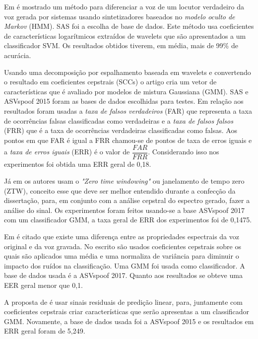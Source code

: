 \begin{myenv}{1.5}
		\par Em \cite{DiqunYan2019} é mostrado um método para diferenciar a voz de um locutor verdadeiro da voz gerada por sistemas usando sintetizadores baseados no \textit{modelo oculto de Markov} (HMM). SAS\cite{SAS2019} foi a escolha de base de dados. Este método usa coeficientes de características logarítmicos extraídos de wavelets que são apresentados a um classificador SVM. Os resultados obtidos tiverem, em média, mais de 99\% de acurácia.
		
		\par Usando uma decomposição por espalhamento baseada em wavelets e convertendo o resultado em coeficientes cepstrais (SCCs) o artigo \cite{7802552} cria um vetor de características que é avaliado por modelos de mistura Gaussiana (GMM). SAS e ASVspoof 2015 \cite{ASVspoof2015} foram as bases de dados escolhidas para testes. Em relação aos resultados foram usadas a \textit{taxa de falsos verdadeiros} (FAR) que representa a taxa de ocorrências falsas classificadas como verdadeiras e a \textit{taxa de falsos falsos} (FRR) que é a taxa de ocorrências verdadeiras classificadas como falsas. Aos pontos em que FAR é igual a FRR chamou-se de pontos de taxa de erros iguais e a \textit{taxa de erros iguais} (ERR) é o valor de $\dfrac{FAR}{FRR}$. Considerando isso nos experimentos foi obtida uma ERR geral de 0,18.

		\par Já em \cite{alluri2019replay} os autores usam o \textit{"Zero time windowing"} ou janelamento de tempo zero (ZTW), conceito esse que deve ser melhor entendido durante a confecção da dissertação, para, em conjunto com a análise cepstral do espectro gerado, fazer a análise do sinal. Os experimentos foram feitos usando-se a base ASVspoof 2017\cite{ASVspoof2017} com um classificador GMM, a taxa geral de ERR dos experimentos foi de 0,1475.
		
		\par Em \cite{8725688} é citado que existe uma diferença entre as propriedades espectrais da voz original e da voz gravada. No escrito são usados coeficientes cepstrais sobre os quais são aplicados uma média e uma normaliza de variância para diminuir o impacto dos ruídos na classificação. Uma GMM foi usada como classificador. A base de dados usada é a ASVspoof 2017. Quanto aos resultados se obteve uma EER geral menor que 0,1.
	
		\par A proposta de \cite{Hanilci2018} é usar sinais residuais de predição linear, para, juntamente com coeficientes cepstrais criar características que serão apresentas a um classificador GMM. Novamente, a base de dados usada foi a ASVspoof 2015 e os resultados em ERR geral foram de 5,249.


\end{myenv}
